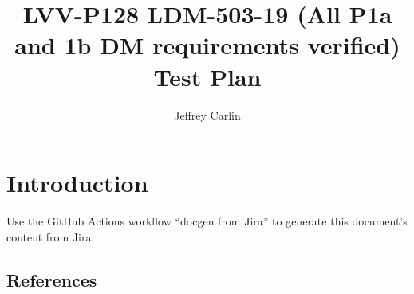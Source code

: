 \documentclass[DM,lsstdraft,toc]{lsstdoc}
\begin{document}
\def\milestoneName{LDM-503-19 (All P1a and 1b DM requirements verified)}
\def\milestoneId{LVV-P128}
\def\product{Data Management}


\title{LVV-P128 LDM-503-19 (All P1a and 1b DM requirements verified) Test Plan }
\setDocRef{\lsstDocType-\lsstDocNum}
\date{\vcsDate}
\author{Jeffrey Carlin}




\maketitle

\section{Introduction}
Use the GitHub Actions workflow ``docgen from Jira'' to generate this document's content from Jira.

\subsection{References}
\label{sect:references}
\renewcommand{\refname}{}




\end{document}
